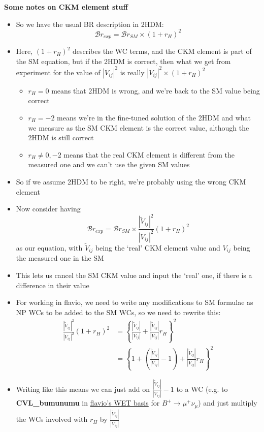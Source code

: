 \documentclass[11pt]{article}
\newcommand{\tVVt}{\frac{|\tilde{V}_{ij}|^2}{|V_{ij}|^2}}
\newcommand{\tVV}{\frac{|\tilde{V}_{ij}|}{|V_{ij}|}}
\begin{document}
{\Large\bfseries Some notes on CKM element stuff}
\begin{itemize}
    \item So we have the usual BR description in 2HDM:
        \begin{equation*}
            \mathcal{B}r_{exp} = \mathcal{B}r_{SM}\times(1+r_H)^2
        \end{equation*}
    \item Here, $(1+r_H)^2$ describes the WC terms, and the CKM element is part of the SM equation, but if the 2HDM is correct, then what we get from experiment for the value of $|V_{ij}|^2$ is really $|V_{ij}|^2\times(1+r_H)^2$
        \begin{itemize}
            \item $r_H=0$ means that 2HDM is wrong, and we're back to the SM value being correct
            \item $r_H=-2$ means we're in the fine-tuned solution of the 2HDM and what we measure as the SM CKM element is the correct value, although the 2HDM is still correct
            \item $r_H\neq0,-2$ means that the real CKM element is different from the measured one and we can't use the given SM values
        \end{itemize}
    \item So if we assume 2HDM to be right, we're probably using the wrong CKM element
    \item Now consider having
        \begin{equation*}
            \mathcal{B}r_{exp} = \mathcal{B}r_{SM}\times\tVVt(1+r_H)^2
        \end{equation*}
        as our equation, with $\tilde{V}_{ij}$ being the `real' CKM element value and $V_{ij}$ being the measured one in the SM
    \item This lets us cancel the SM CKM value and input the `real' one, if there is a difference in their value
    \item For working in flavio, we need to write any modifications to SM formulae as NP WCs to be added to the SM WCs, so we need to rewrite this:
        \begin{align*}
            \tVVt(1+r_H)^2 &= \left\{\tVV+\tVV r_H\right\}^2 \\
                           &= \left\{1+\left(\tVV-1\right)+\tVV r_H\right\}^2
        \end{align*}
    \item Writing like this means we can just add on $\tVV-1$ to a WC (e.g. to \textbf{CVL\_bumunumu} in \href{https://wcxf.github.io/assets/pdf/WET.flavio.pdf}{flavio's WET basis} for $B^+\to\mu^+\nu_\mu$) and just multiply the WCs involved with $r_H$ by $\tVV$ 

\end{itemize}
\end{document}
